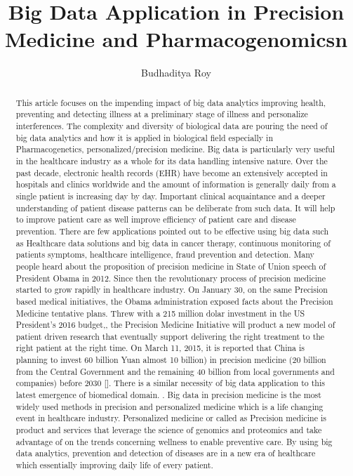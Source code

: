 \documentclass[sigconf]{acmart}
\begin{document}
\title{Big Data Application in Precision Medicine and Pharmacogenomicsn}


\author{Budhaditya Roy}

\renewcommand{\shortauthors}{B.Roy.}


\begin{abstract}
This article focuses on the impending impact of big data analytics improving health, preventing and detecting illness at a preliminary stage of illness and personalize interferences. The complexity and diversity of biological data are pouring the need of big data analytics and how it is applied in biological field especially in Pharmacogenetics, personalized/precision medicine. Big data is particularly very useful in the healthcare industry as a whole for its data handling intensive nature. Over the past decade, electronic health records (EHR) have become an extensively accepted in hospitals and clinics worldwide and the amount of information is generally daily from a single patient is increasing day by day. Important clinical acquaintance and a deeper understanding of patient disease patterns can be deliberate from such data. It will help to improve patient care as well improve efficiency of patient care and disease prevention. There are few applications pointed out to be effective using big data such as Healthcare data solutions and big data in cancer therapy, continuous monitoring of patients symptoms, healthcare intelligence, fraud prevention and detection. Many people heard about the proposition of precision medicine in State of Union speech of President Obama in 2012. Since then the revolutionary process of precision medicine started to grow rapidly in healthcare industry. On January 30, on the same Precision based medical initiatives, the Obama administration exposed facts about the Precision Medicine tentative plans. Threw with a 215 million dolar investment in the US President’s 2016 budget,, the Precision Medicine Initiative will product a new model of patient driven research that eventually support delivering the right treatment to the right patient at the right time\cite{editor01}. On March 11, 2015, it is reported that China is planning to invest 60 billion Yuan almost 10 billion) in precision medicine (20 billion from the Central Government and the remaining 40 billion from local governments and companies) before 2030 [\cite{editor01}]. There is a similar necessity of big data application to this latest emergence of biomedical domain. . Big data in precision medicine is the most widely used methods in precision and personalized medicine which is a life changing event in healthcare industry. Personalized medicine or called as Precision medicine is product and services that leverage the science of genomics and proteomics and take advantage of on the trends concerning wellness to enable preventive care. By using big data analytics, prevention and detection of diseases are in a new era of healthcare which essentially improving daily life of every patient. 
\end{abstract}
\end{document}
